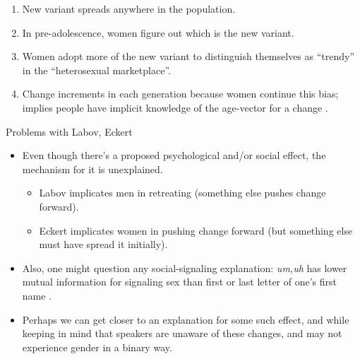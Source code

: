 \documentclass[hyperref={pdfpagelabels=false}]{beamer}
\begin{document}
\begin{frame}{\citet{eckert2011}}
	\begin{enumerate}
	\item New variant spreads anywhere in the population.
	\item In pre-adolescence, women figure out which is the new variant.
	\item Women adopt more of the new variant to distinguish themselves as ``trendy'' in the ``heterosexual marketplace''.
	\item Change increments in each generation because women continue this bias; implies people have implicit knowledge of the age-vector for a change \citep[weak evidence from][]{drager2011}.
	\end{enumerate}
\end{frame}

\begin{frame}{Problems with Labov, Eckert}
	\begin{itemize}
	\item Even though there's a proposed psychological and/or social effect, the mechanism for it is unexplained.
		\begin{itemize}
		\item Labov implicates men in retreating (something else pushes change forward).
		\item Eckert implicates women in pushing change forward (but something else must have spread it initially).
		\end{itemize}
	\item Also, one might question any social-signaling explanation: \textsl{um,uh} has lower mutual information for signaling sex than first or last letter of one's first name \citep{fruehwald2015}.
	\item Perhaps we can get closer to an explanation for some such effect, and while keeping in mind that speakers are unaware of these changes, and may not experience gender in a binary way.
	\end{itemize}
\end{frame}



\end{document}
